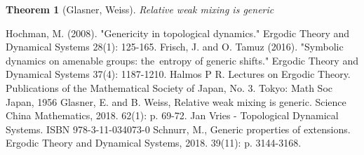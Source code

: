 \documentclass{article}
\newtheorem{theorem}{Theorem}
\begin{document}
\begin{CJK}{UTF8}{gbsn}
\begin{theorem}[Glasner, Weiss]
	Relative weak mixing is generic
\end{theorem}





\begin{thebibliography}{99}
Hochman, M. (2008). "Genericity in topological dynamics." Ergodic Theory and Dynamical Systems 28(1): 125-165.
Frisch, J. and O. Tamuz (2016). "Symbolic dynamics on amenable groups: the entropy of generic shifts." Ergodic Theory and Dynamical Systems 37(4): 1187-1210.
Halmos P R. Lectures on Ergodic Theory. Publications of the Mathematical Society of Japan, No. 3. Tokyo: Math
Soc Japan, 1956
Glasner, E. and B. Weiss, Relative weak mixing is generic. Science China Mathematics, 2018. 62(1): p. 69-72.
Jan Vries - Topological Dynamical Systems. ISBN 978-3-11-034073-0
Schnurr, M., Generic properties of extensions. Ergodic Theory and Dynamical Systems, 2018. 39(11): p. 3144-3168.

\end{thebibliography}


\end{CJK}
\end{document}
